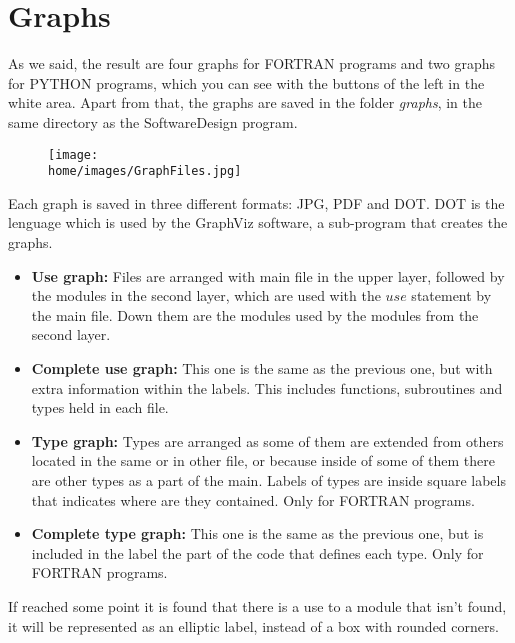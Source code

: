 \newpage

\section*{Graphs}


As we said, the result are four graphs for FORTRAN programs and two graphs for PYTHON programs, which you can see with the buttons of the left in the white area. Apart from that, the graphs are saved in the folder \textit{graphs}, in the same directory as the SoftwareDesign program. 

\begin{figure}[H]
	\begin{center}
		\texttt{[image: \\home/images/GraphFiles.jpg]}
	\end{center}
\end{figure}

Each graph is saved in three different formats: JPG, PDF and DOT. DOT is the lenguage which is used by the GraphViz software, a sub-program that creates the graphs.


\begin{itemize}
    \item \textbf{Use graph:} Files are arranged with main file in the upper layer, followed by the modules in the second layer, which are used with the $ use $ statement by the main file. Down them are the modules used by the modules from the second layer.
    \item \textbf{Complete use graph:} This one is the same as the previous one, but with extra information within the labels. This includes functions, subroutines and types held in each file.
    \item \textbf{Type graph:} Types are arranged as some of them are extended from others located in the same or in other file, or because inside of some of them there are other types as a part of the main. Labels of types are inside square labels that indicates where are they contained. Only for FORTRAN programs.
    \item \textbf{Complete type graph:} This one is the same as the previous one, but is included in the label the part of the code that defines each type. Only for FORTRAN programs.
\end{itemize}

If reached some point it is found that there is a use to a module that isn't found, it will be represented as an elliptic label, instead of a box with rounded corners.

